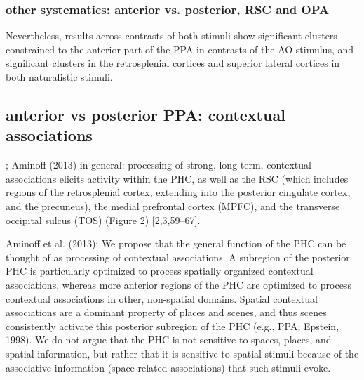 \documentclass[english]{article}
\begin{document}
\subsubsection{other systematics: anterior vs. posterior, RSC and OPA}

Nevertheless, results across contrasts of both stimuli show significant clusters
constrained to the anterior part of the PPA in contrasts of the AO stimulus, and
significant clusters in the retrosplenial cortices and superior lateral cortices
in both naturalistic stimuli.

\subsection{anterior vs posterior PPA: contextual associations}


\citep{aminoff2006parahippocampal, aminoff2013role}; Aminoff (2013) in general:
processing of strong, long-term, contextual associations elicits activity within
the PHC, as well as the RSC (which includes regions of the retrosplenial cortex,
extending into the posterior cingulate cortex, and the precuneus), the medial
prefrontal cortex (MPFC), and the transverse occipital sulcus (TOS) (Figure 2)
[2,3,59–67].

Aminoff et al. (2013): We propose that the general function of the PHC can be
thought of as processing of contextual associations. A subregion of the
posterior PHC is particularly optimized to process spatially organized
contextual associations, whereas more anterior regions of the PHC are optimized
to process contextual associations in other, non-spatial domains.
Spatial contextual associations are a dominant property of places and scenes,
and thus scenes consistently activate this posterior subregion of the PHC (e.g.,
PPA; Epstein, 1998). We do not argue that the PHC is not sensitive to
spaces, places, and spatial information, but rather that it is sensitive to
spatial stimuli because of the associative information (space-related
associations) that such stimuli evoke.
\end{document}
